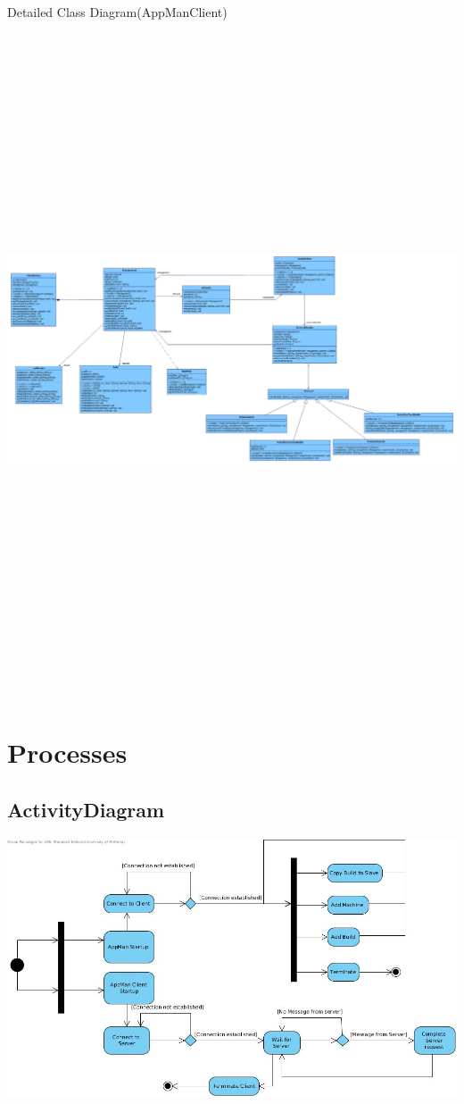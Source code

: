 \documentclass[a4paper,12pt,final]{article}
\begin{document}
\newpage
\begin{center}
Detailed Class Diagram(AppManClient)
\includegraphics[angle = 90, height=20cm]{ClassDiagramAppManClient.jpg} 
\end{center}

\section{Processes}
\subsection{ActivityDiagram}
\begin{center}
\includegraphics[scale=0.38]{ActivityDiagram.jpg} 
\end{center}
\end{document}
